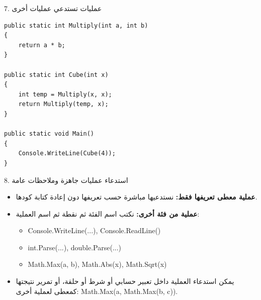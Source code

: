 \documentclass[13pt]{beamer}
\begin{document}
\begin{frame}[fragile]{$7$. عمليات تستدعي عمليات أخرى}
\begin{english}
\begin{lstlisting}[language=CSharp]
public static int Multiply(int a, int b)
{
    return a * b;
}

public static int Cube(int x)
{
    int temp = Multiply(x, x);
    return Multiply(temp, x);
}

public static void Main()
{
    Console.WriteLine(Cube(4));
}
\end{lstlisting}
\end{english}
\end{frame}

\begin{frame}[fragile]{$8$. استدعاء عمليات جاهزة وملاحظات عامة}
\begin{itemize}
  \item \textbf{عملية معطى تعريفها فقط:} نستدعيها مباشرة حسب تعريفها دون إعادة كتابة كودها.
  \item \textbf{عملية من فئة أخرى:} نكتب اسم الفئة ثم نقطة ثم اسم العملية:
  \begin{itemize}
    \item \textenglish{Console.WriteLine(...)}, \textenglish{Console.ReadLine()}
    \item \textenglish{int.Parse(...)}, \textenglish{double.Parse(...)}
    \item \textenglish{Math.Max(a, b)}, \textenglish{Math.Abs(x)}, \textenglish{Math.Sqrt(x)}
  \end{itemize}
  \item يمكن استدعاء العملية داخل تعبير حسابي أو شرط أو حلقة، أو تمرير نتيجتها كمعطى لعملية أخرى: \textenglish{Math.Max(a, Math.Max(b, c))}.
\end{itemize}
\end{frame}
\end{document}
